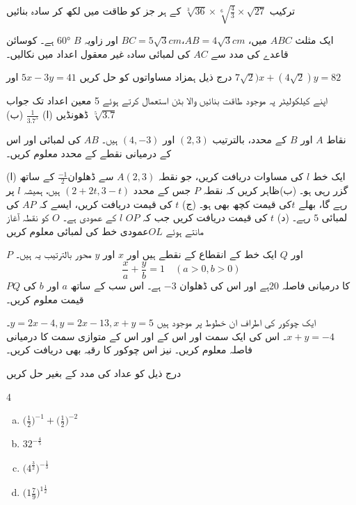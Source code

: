 ترکیب \(\sqrt[3]{36}\times\sqrt[6]{\frac{4}{3}}\times\sqrt{27}\)
 کے ہر جز کو طاقت میں لکھ کر سادہ بنائیں

ایک مثلث \(ABC\) میں، \(AB=4\sqrt{3}cm\)،\(BC=5\sqrt{3}cm\) اور زاویہ
 \(B\) \(\ang{60}\)
 ہے۔ کوسائن قاعدے کی مدد سے \(AC\) کی لمبائی سادہ غیر معقول اعداد میں نکالیں۔

درج ذیل ہمزاد مساواتوں کو حل کریں
\(5x-3y=41\) اور \(7\sqrt{2})x+(4\sqrt{2})y=82\)

اپنے کیلکولیٹر پہ موجود طاقت بنائیں والا بٹن استعمال کرتے ہوئے 5 معین اعداد تک جواب ڈھونڈیں
(ا) 
\(\frac{1}{3.7^{5}}\)
(ب)
 \(\sqrt[5]{3.7}\)

نقاط \(A\) اور \(B\) کے محدد، بالترتیب \((2,3)\) اور
\((4,-3)\) ہیں۔ \(AB\) کی لمبائی اور اس کے درمیانی نقطے کے محدد معلوم کریں۔

(ا) ایک خط \(l\) کی مساوات دریافت کریں، جو نقطہ \(A(2,3)\) سے ڈھلوان\(\frac{-1}{2}\) کے ساتھ گزر رہی ہو۔
(ب)ظاہر کریں کہ نقطہ \(P\) جس کے محدد \((2+2t,3-t)\) ہیں، ہمیشہ \(l\) پر رہے گا، بھلے \(t\)کی قیمت کچھ بھی ہو۔
(ج) \(t\) کی قیمت دریافت کریں، ایسے کہ \(AP\) کی لمبائی \(5\) رہے۔
(د) \(t\) کی قیمت دریافت کریں جب کہ \(OP\) \(l\) کے عمودی ہے۔ \(O\) کو نقطہ آغاز مانتے ہوئے \(OL\)عمودی خط کی لمبائی معلوم کریں



\(P\) اور \(Q\) ایک خط کے انقطاع کے نقطے ہیں
اور \(x\) اور \(y\) محور بالترتیب یہ ہیں۔
\[\frac{x}{a}+\frac{y}{b}=1\quad(a>0,b>0)\]
\(PQ\) کا درمیانی فاصلہ \(20\)ہے اور اس کی ڈھلوان \(-3\) ہے۔ اس سب کے ساتھ \(a\) اور \(b\) کی قیمت معلوم کریں۔

ایک چوکور کی اطراف ان خطوط پر موجود ہیں \(y=2x-4, y=2x-13, x+y=5\)۔\(x+y=-4\)۔
اس کی ایک سمت اور اس کے اور اس کے متوازی سمت کا درمیانی فاصلہ معلوم کریں۔ نیز اس چوکور کا رقبہ بھی دریافت کریں۔

درج ذیل کو عداد کی مدد کے بغیر حل کریں
\begin{multicols}{4}
\begin{enumerate}[a.]
\item
\(\Big(\frac{1}{2}\Big)^{-1}+\Big(\frac{1}{2}\Big)^{-2}\)
\item
\(32^{-\frac{4}{5}}\)
\item
\(\Big(4^{\frac{3}{2}}\Big)^{-\frac{1}{3}}\)
\item
\(\Big(1\frac{7}{9}\Big)^{1\frac{1}{2}}\)
\end{enumerate}
\end{multicols}

